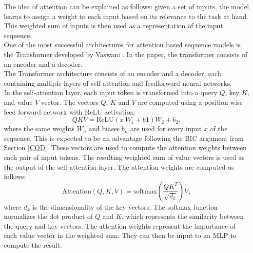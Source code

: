 The idea of attention can be explained as follows: given a set of inputs, the model learns to assign a weight to each input based on its relevance to the 
task at hand.
This weighted sum of inputs is then used as a representation of the input sequence.\\

One of the most successful architectures for attention based sequence models is the Transformer developed by Vaswani \etAl \cite{vaswani2017attention}. In the paper, the transformer 
consists of an encoder and a decoder.\\

The Transformer architecture consists of an encoder and a decoder, each containing multiple layers of self-attention and feedforward neural networks. \\
In the self-attention layer, each input token is transformed into a query $Q$, key $K$, and value $V$ vector. 
The vectors $Q$, $K$ and $V$ are computed using a position wise feed forward network with ReLU activation:
\begin{equation}
    QKV = \text{ReLU}(x \ W_1 + b1)W_2 + b_2,
\end{equation}
where the same weights $W_n$ and biases $b_n$ are used for every input $x$ of the sequence. This is expected to be an advantage following the BIC argument from Section \ref{COD}. 
These vectors are used to compute the attention weights between each pair of input tokens.
The resulting weighted sum of value vectors is used as the output of the self-attention layer.
The attention weights are computed as follows:
\begin{equation}
\text{Attention}(Q, K, V) = \text{softmax}\left(\frac{QK^T}{\sqrt{d_k}}\right)V,
\end{equation}
where $d_k$ is the dimensionality of the key vectors.
The softmax function normalizes the dot product of $Q$ and $K$, which represents the similarity between the query and key vectors.
The attention weights represent the importance of each value vector in the weighted sum. They can then be input to an MLP to compute the result.\\
 
